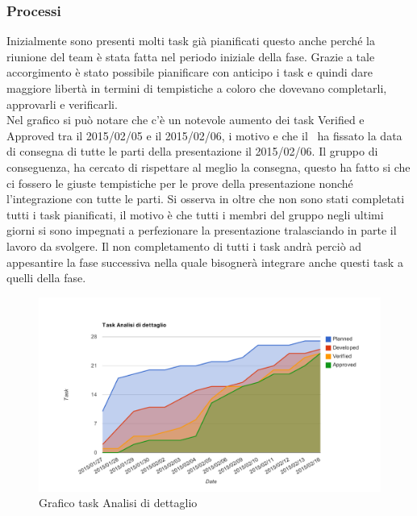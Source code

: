 		\subsubsection{Processi}
		Inizialmente sono presenti molti task già pianificati questo anche perché la  riunione del team è stata fatta nel periodo iniziale della fase. Grazie a tale accorgimento è stato possibile pianificare con anticipo i task e quindi dare maggiore libertà in termini di tempistiche a coloro che dovevano completarli,  approvarli e verificarli.  \\
		Nel grafico si può notare che c'è un notevole aumento dei task Verified e Approved tra il 2015/02/05 e il 2015/02/06, i motivo e che il \roleProjectManager \ ha fissato la data di consegna di tutte le parti della presentazione il 2015/02/06. Il gruppo di conseguenza, ha cercato di rispettare al meglio la consegna, questo ha fatto si che ci fossero le giuste tempistiche per le prove della presentazione nonché l'integrazione con tutte le parti. Si osserva in oltre che non sono stati completati tutti i task pianificati, il motivo è che tutti i membri del gruppo negli ultimi giorni si sono impegnati a perfezionare la presentazione tralasciando in parte il lavoro da svolgere. Il non completamento di tutti i task andrà perciò ad appesantire la fase successiva nella quale bisognerà integrare anche questi task a quelli della fase.
		\begin{figure}[htbp]
				\centering
				\centerline{\includegraphics[scale=1]{images/Grafico_fase_3.pdf}}
				\caption{Grafico task Analisi di dettaglio}
				\label{fig:taskfase3}
			\end{figure}	
				

